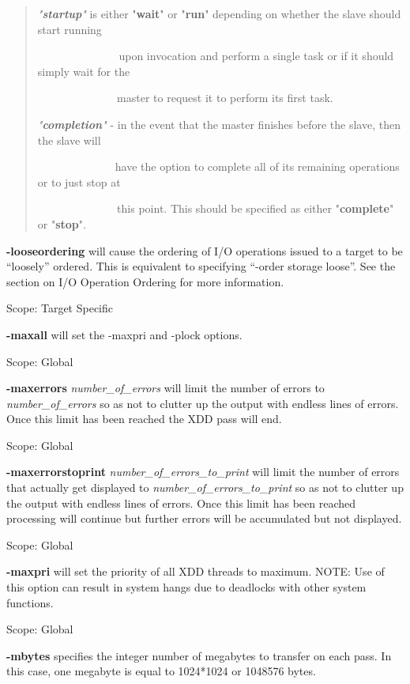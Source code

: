 \begin{quote}
\emph{"\textbf{startup}"} is either "\textbf{wait}" or "\textbf{run}" depending on whether the slave should start running\\
\strut ~~~~~~~~~~~~~~ upon invocation and perform a single task or if it should simply wait for the\\
\strut ~~~~~~~~~~~~ ~ master to request it to perform its first task.

\emph{"\textbf{completion}"} - in the event that the master finishes before the slave, then the slave will\\
\strut ~~~~~~~~~ ~ ~~ have the option to complete all of its remaining operations or to just stop at\\
\strut ~~~~~~~~~~~~ ~ this point. This should be specified as either "\textbf{complete}" or "\textbf{stop}".
\end{quote}

\textbf{-looseordering} will cause the ordering of I/O operations issued to a target to be ``loosely'' ordered. This is equivalent to specifying ``-order storage loose''. See the section on I/O Operation Ordering for more information.

Scope: Target Specific

\textbf{-maxall} will set the -maxpri and -plock options.

Scope: Global

\textbf{-maxerrors} \emph{number\_of\_errors} will limit the number of errors to \emph{number\_of\_errors} so as not to clutter up the output with endless lines of errors. Once this limit has been reached the XDD pass will end.

Scope: Global

\textbf{-maxerrorstoprint} \emph{number\_of\_errors\_to\_print} will limit the number of errors that actually get displayed to \emph{number\_of\_errors\_to\_print} so as not to clutter up the output with endless lines of errors. Once this limit has been reached processing will continue but further errors will be accumulated but not displayed.

Scope: Global

\textbf{-maxpri} will set the priority of all XDD threads to maximum. NOTE: Use of this option can result in system hangs due to deadlocks with other system functions.

Scope: Global

\textbf{-mbytes} specifies the integer number of megabytes to transfer on each pass. In this case, one megabyte is equal to 1024*1024 or 1048576 bytes.

